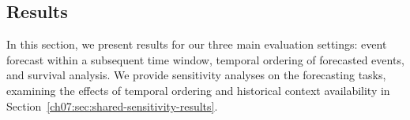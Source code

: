 \subsection{Results}

In this section, we present results for our three main evaluation settings: event forecast within a subsequent time window, temporal ordering of forecasted events, and survival analysis.
We provide sensitivity analyses on the forecasting tasks, examining the effects of temporal ordering and historical context availability in Section~\ref{ch07:sec:shared-sensitivity-results}.

